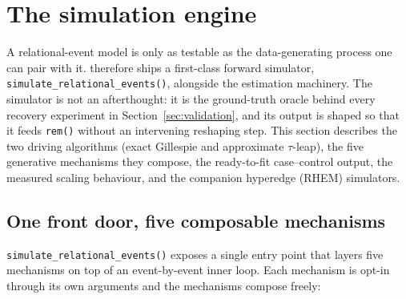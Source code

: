 \section{The simulation engine}
\label{sec:simulation}

A relational-event model is only as testable as the data-generating
process one can pair with it.  therefore ships a first-class
forward simulator, \texttt{simulate\_relational\_events()}, alongside the
estimation machinery. The simulator is not an afterthought: it is the
ground-truth oracle behind every recovery experiment in
Section~\ref{sec:validation}, and its output is shaped so that it feeds
\texttt{rem()} without an intervening reshaping step. This section
describes the two driving algorithms (exact Gillespie and approximate
$\tau$-leap), the five generative mechanisms they compose, the
ready-to-fit case--control output, the measured scaling behaviour, and the
companion hyperedge (RHEM) simulators.

\subsection{One front door, five composable mechanisms}
\label{sec:sim-mechanisms}

\texttt{simulate\_relational\_events()} exposes a single entry point that
layers five mechanisms on top of an event-by-event inner loop. Each
mechanism is opt-in through its own arguments and the mechanisms compose
freely:

